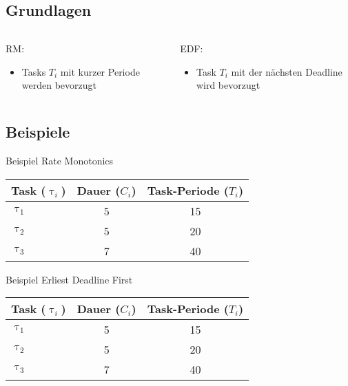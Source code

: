\subsection{Grundlagen}
\begin{frame}{\subsecname}
		\begin{columns}[]
  			\begin{column}{0.5\textwidth}
				RM:
				\begin{itemize}
					\item Tasks $T_i$ mit kurzer Periode werden bevorzugt
				\end{itemize}

			\end{column}
  			\begin{column}{0.5\textwidth}
  				EDF:
				\begin{itemize}
					\item Task $T_i$ mit der nächsten Deadline wird bevorzugt
				\end{itemize}	
  			\end{column}
		\end{columns}
\end{frame}

\subsection{Beispiele}

\newcommand{\showRMSlide}[1] {\begin{frame}{Beispiel Rate Monotonics}
	\begin{center}
		\begin{tabular}{l||c|c}
				Task ($\uptau_i$) & Dauer ($C_i$) & Task-Periode ($T_i$)\\\hline\hline
				$\uptau_1$ & 5 & 15\\
				$\uptau_2$ & 5 & 20\\
				$\uptau_3$ & 7 & 40\\
		\end{tabular}
	\end{center}
	
\end{frame}}

%
{%
	\showRMSlide{\arabic{ct}}
}

\newcommand{\showEDFSlide}[1] {\begin{frame}{Beispiel Erliest Deadline First}
	\begin{center}
		\begin{tabular}{l||c|c}
				Task ($\uptau_i$) & Dauer ($C_i$) & Task-Periode ($T_i$)\\\hline\hline
				$\uptau_1$ & 5 & 15\\
				$\uptau_2$ & 5 & 20\\
				$\uptau_3$ & 7 & 40\\
		\end{tabular}
	\end{center}
	
\end{frame}}

%
{%
	\showEDFSlide{\arabic{ct}}
}